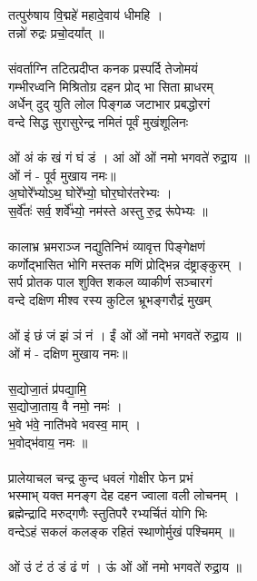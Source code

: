 \subsection{}
तत्पुरु॑षाय वि॒द्महे॑ महादे॒वाय॑ धीमहि । \\
तन्नो॑ रुद्रः प्रचो॒दया᳚त् ॥\\
\\
संवर्ताग्नि तटित्प्रदीप्त कनक प्रस्पर्दि तेजोमयं\\
गम्भीरध्वनि  मिश्रितोग्र दहन प्रोद् भा सिता म्राधरम्\\
अर्धेन् दुद् युति लोल पिङ्गळ जटाभार प्रबद्धोरगं\\
वन्दे सिद्ध सुरासुरेन्द्र नमितं पूर्वं मुखंशूलिनः \\
\\
ओं अं कं खं गं घं डं । आं ओं ओं नमो भगवते॑ रुद्रा॒य ॥\\
ओं नं - पूर्व मुखाय नमः॥\\
अ॒घोरे᳚भ्योऽथ॒ घोरे᳚भ्यो॒ घोर॒घोर॑तरेभ्यः । \\
स॒र्वे᳚तः॑ सर्व॒ शर्वे᳚भ्यो॒ नम॑स्ते अस्तु रु॒द्र रू॑पेभ्यः ॥\\
\\
कालाभ्र भ्रमराञ्ज नद्युतिनिभं व्यावृत्त पिङ्गेक्षणं\\
कर्णोद्भासित भोगि मस्तक मणिं प्रोद्भिन्न दंष्ट्राङ्कुरम् ।\\
सर्प प्रोतक पाल शुक्ति शकल व्याकीर्ण सञ्चारगं\\
वन्दे दक्षिण मीश्व रस्य कुटिल भ्रूभङ्गरौद्रं मुखम् \\
\\
ओं इं छं जं झं ञं नं । ईं ओं ओं नमो भगवते॑ रुद्रा॒य ॥\\
ओं मं  - दक्षिण मुखाय नमः॥\\
\\
स॒द्योजा॒तं प्र॑पद्या॒मि॒ \\
स॒द्योजा॒ताय॒ वै नमो॒ नमः॑ ।\\
भ॒वे भ॑वे॒ नाति॑भवे भवस्व॒ माम् । \\
भ॒वोद्भ॑वाय॒ नमः ॥\\
\\
प्रालेयाचल चन्द्र कुन्द धवलं गोक्षीर फेन प्रभं\\
भस्माभ् यक्त मनङ्ग देह दहन ज्वाला वली लोचनम् ।\\
ब्रह्मेन्द्रादि मरुद्गणैः स्तुतिपरै रभ्यर्चितं योगि भिः\\
वन्देऽहं सकलं कलङ्क रहितं स्थाणोर्मुखं पश्चिमम् ॥\\
\\
ओं उं टं ठं डं ढं णं । ऊं ओं ओं नमो भगवते॑ रुद्रा॒य ॥\\
